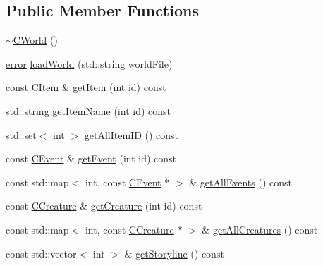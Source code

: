 \subsection*{Public Member Functions}
\begin{DoxyCompactItemize}
\item 
\mbox{\hyperlink{class_c_world_ac7905380d07d6f907b7f18db4e6442df}{$\sim$\+C\+World}} ()
\item 
\mbox{\hyperlink{_errors_list_8h_af10dacfa214e2575bb2e0ee407c242e0}{error}} \mbox{\hyperlink{class_c_world_a944f12acb1ff76beed2648647ff19d0f}{load\+World}} (std\+::string world\+File)
\item 
const \mbox{\hyperlink{class_c_item}{C\+Item}} \& \mbox{\hyperlink{class_c_world_aae01822f61bfe35284a1ca9c02bdb1a5}{get\+Item}} (int id) const
\item 
std\+::string \mbox{\hyperlink{class_c_world_ac1e953c25242ba775f667aec3e6242bd}{get\+Item\+Name}} (int id) const
\item 
std\+::set$<$ int $>$ \mbox{\hyperlink{class_c_world_a1c10d5ec2514347fd3fe28f85b23db13}{get\+All\+Item\+ID}} () const
\item 
const \mbox{\hyperlink{class_c_event}{C\+Event}} \& \mbox{\hyperlink{class_c_world_a88b90cecbca7d5bcb6575b6a9d94e026}{get\+Event}} (int id) const
\item 
const std\+::map$<$ int, const \mbox{\hyperlink{class_c_event}{C\+Event}} $\ast$ $>$ \& \mbox{\hyperlink{class_c_world_a325d979d0d2b15db1e3badec7201c960}{get\+All\+Events}} () const
\item 
const \mbox{\hyperlink{class_c_creature}{C\+Creature}} \& \mbox{\hyperlink{class_c_world_a3c5750b369a9384ace4570c27da37386}{get\+Creature}} (int id) const
\item 
const std\+::map$<$ int, const \mbox{\hyperlink{class_c_creature}{C\+Creature}} $\ast$ $>$ \& \mbox{\hyperlink{class_c_world_aaf3f4f470883d06d0b37498ba3816430}{get\+All\+Creatures}} () const
\item 
const std\+::vector$<$ int $>$ \& \mbox{\hyperlink{class_c_world_a72b79b6801a9e7ae670cc3790acf31d2}{get\+Storyline}} () const
\end{DoxyCompactItemize}
